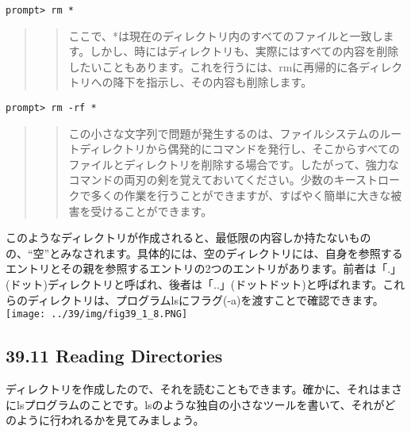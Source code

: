\begin{verbatim}
prompt> rm *
\end{verbatim}

\begin{quote}
\begin{quote}
ここで、*は現在のディレクトリ内のすべてのファイルと一致します。しかし、時にはディレクトリも、実際にはすべての内容を削除したいこともあります。これを行うには、rmに再帰的に各ディレクトリへの降下を指示し、その内容も削除します。
\end{quote}
\end{quote}

\begin{verbatim}
prompt> rm -rf *
\end{verbatim}

\begin{quote}
\begin{quote}
この小さな文字列で問題が発生するのは、ファイルシステムのルートディレクトリから偶発的にコマンドを発行し、そこからすべてのファイルとディレクトリを削除する場合です。したがって、強力なコマンドの両刃の剣を覚えておいてください。少数のキーストロークで多くの作業を行うことができますが、すばやく簡単に大きな被害を受けることができます。
\end{quote}
\end{quote}

このようなディレクトリが作成されると、最低限の内容しか持たないものの、``空''とみなされます。具体的には、空のディレクトリには、自身を参照するエントリとその親を参照するエントリの2つのエントリがあります。前者は「.」(ドット)ディレクトリと呼ばれ、後者は「..」(ドットドット)と呼ばれます。これらのディレクトリは、プログラムlsにフラグ(-a)を渡すことで確認できます。\\
\texttt{[image: ../39/img/fig39\_1\_8.PNG]}

\hypertarget{reading-directories}{%
\subsection*{39.11 Reading Directories}\label{reading-directories}}

ディレクトリを作成したので、それを読むこともできます。確かに、それはまさにlsプログラムのことです。lsのような独自の小さなツールを書いて、それがどのように行われるかを見てみましょう。

